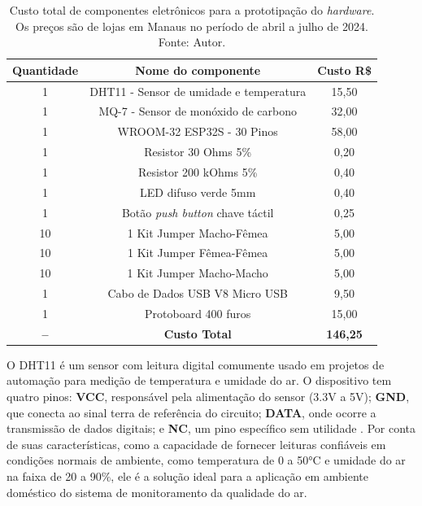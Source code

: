\begin{table}[h!]
    \centering
    \caption{Custo total de componentes eletrônicos para a prototipação do \textit{hardware}. Os preços são de lojas em Manaus no período de abril a julho de 2024. Fonte: Autor.}\label{tabPrecoHardware}
    \begin{tabular}{c|c|c}
        \hline
        \textbf{Quantidade} & \textbf{Nome do componente} & \textbf{Custo R\$} \\
        \hline
        1 & DHT11 - Sensor de umidade e temperatura & 15,50 \\
        \hline
        1 & MQ-7 - Sensor de monóxido de carbono & 32,00 \\
        \hline
        1 & WROOM-32 ESP32S - 30 Pinos & 58,00 \\
        \hline
        1 & Resistor 30 Ohms 5\% & 0,20 \\
        \hline
        1 & Resistor 200 kOhms 5\% & 0,40 \\
        \hline
        1 & LED difuso verde 5mm & 0,40 \\
        \hline
        1 & Botão \textit{push button} chave táctil & 0,25 \\
        \hline
        10 & 1 Kit Jumper Macho-Fêmea & 5,00 \\
        \hline
        10 & 1 Kit Jumper Fêmea-Fêmea & 5,00 \\
        \hline
        10 & 1 Kit Jumper Macho-Macho & 5,00 \\
        \hline
        1 & Cabo de Dados USB V8 Micro USB & 9,50 \\
        \hline
        1 & Protoboard 400 furos & 15,00 \\
        \hline
        \textbf{--} & \textbf{Custo Total} & \textbf{146,25} \\
        \hline
    \end{tabular}
\end{table}

O DHT11 é um sensor com leitura digital comumente usado em projetos de automação para medição de temperatura e umidade do ar. O dispositivo 
tem quatro pinos: \textbf{VCC}, responsável pela alimentação do sensor (3.3V a 5V); \textbf{GND}, que conecta ao sinal terra de referência do circuito; \textbf{DATA}, onde ocorre a transmissão 
de dados digitais; e \textbf{NC}, um pino específico sem utilidade \cite{dht11-documentation}. Por conta de suas características, como a capacidade de fornecer leituras confiáveis em condições normais de ambiente, como 
temperatura de 0 a 50°C e umidade do ar na faixa de 20 a 90\%, ele é a solução ideal para a aplicação em ambiente doméstico do sistema de monitoramento da qualidade do ar.

